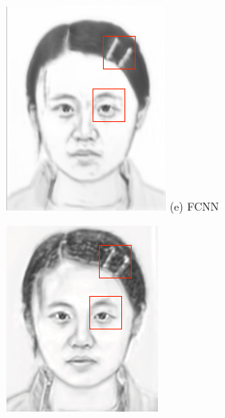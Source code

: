 \documentclass[10pt,twocolumn,letterpaper]{article}
\begin{document}
\begin{figure}[t]
\begin{minipage}[t]{0.24\linewidth}
\includegraphics[width=1\linewidth]{img/example_fcnn.png}
(e) FCNN\cite{zhang2015end}
\end{minipage}
\begin{minipage}[t]{0.23\linewidth}
\centering
\includegraphics[width=1\linewidth]{img/example_bfcn.png}

\end{minipage}
\end{figure}
\end{document}
